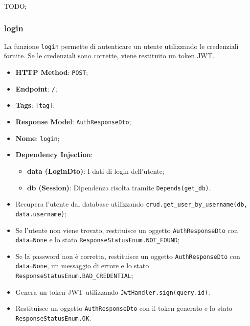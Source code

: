 \par TODO;


\subsubsection{login}

\par La funzione \texttt{login} permette di autenticare un utente utilizzando le credenziali fornite. Se le credenziali sono corrette, viene restituito un token JWT.

\begin{itemize}
 \item \textbf{HTTP Method}: \texttt{POST};
 \item \textbf{Endpoint}: \texttt{/};
 \item \textbf{Tags}: \texttt{[tag]};
 \item \textbf{Response Model}: \texttt{AuthResponseDto};
 \item \textbf{Nome}: \texttt{login};
 \item \textbf{Dependency Injection}:
  \begin{itemize}
    \item \textbf{data (LoginDto)}: I dati di login dell'utente;
    \item \textbf{db (Session)}: Dipendenza risolta tramite \texttt{Depends(get\_db)}.
  \end{itemize}
\end{itemize}

\begin{itemize}
 \item Recupera l'utente dal database utilizzando \texttt{crud.get\_user\_by\_username(db, data.username)};
 \item Se l'utente non viene trovato, restituisce un oggetto \texttt{AuthResponseDto} con \texttt{data=None} e lo stato \texttt{ResponseStatusEnum.NOT\_FOUND};
 \item Se la password non è corretta, restituisce un oggetto \texttt{AuthResponseDto} con \texttt{data=None}, un messaggio di errore e lo stato \texttt{ResponseStatusEnum.BAD\_CREDENTIAL};
 \item Genera un token JWT utilizzando \texttt{JwtHandler.sign(query.id)};
 \item Restituisce un oggetto \texttt{AuthResponseDto} con il token generato e lo stato \texttt{ResponseStatusEnum.OK}.
\end{itemize}

